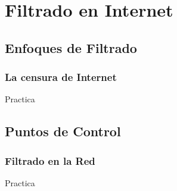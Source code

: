 \documentclass{beamer}
\begin{document}
\section{Filtrado en Internet}
\subsection{Enfoques de Filtrado}
\frame
{
\transdissolve[duration=0.2]
\frametitle{La censura de Internet}
Practica 
}

\subsection{Puntos de Control}
\frame
{
\transdissolve[duration=0.2]
\frametitle{Filtrado en la Red}
Practica 
}
\end{document}
